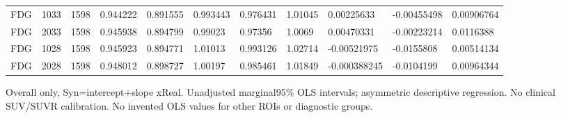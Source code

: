 \begin{landscape}
\begin{longtable}{lllllllllll}
FDG & 1033 & 1598 & 0.944222 & 0.891555 & 0.993443 & 0.976431 & 1.01045 & 0.00225633 & -0.00455498 & 0.00906764 \\
FDG & 2033 & 1598 & 0.945938 & 0.894799 & 0.99023 & 0.97356 & 1.0069 & 0.00470331 & -0.00223214 & 0.0116388 \\
FDG & 1028 & 1598 & 0.945923 & 0.894771 & 1.01013 & 0.993126 & 1.02714 & -0.00521975 & -0.0155808 & 0.00514134 \\
FDG & 2028 & 1598 & 0.948012 & 0.898727 & 1.00197 & 0.985461 & 1.01849 & -0.000388245 & -0.0104199 & 0.00964344 \\
\end{longtable}
\noindent\parbox{\linewidth}{\footnotesize Overall only, Syn=intercept+slope xReal. Unadjusted marginal95\% OLS intervals; asymmetric descriptive regression. No clinical SUV/SUVR calibration. No invented OLS values for other ROIs or diagnostic groups.}
\endgroup
\end{landscape}

